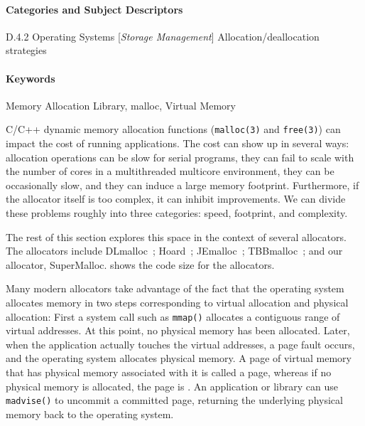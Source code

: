 \documentclass[natbib,sort&compress,10pt]{sigplanconf}
\newcommand{\code}[1]{\texttt{#1}}
\begin{document}
\paragraph{Categories and Subject Descriptors} D.4.2 Operating Systems [\textit{Storage Management}] Allocation/deallocation strategies

\paragraph{Keywords} Memory Allocation Library, malloc, Virtual Memory


C/C++ dynamic memory allocation functions (\code{malloc(3)} and
\code{free(3)}) can impact the cost of running applications.  The cost
can show up in several ways: allocation operations can be slow for
serial programs, they can fail to scale with the number of cores in a
multithreaded multicore environment, they can be occasionally slow,
and they can induce a large memory footprint.  Furthermore, if the
allocator itself is too complex, it can inhibit improvements.  We can
divide these problems roughly into three categories: speed, footprint,
and complexity. 

The rest of this section explores this space in the context of several
allocators.  The allocators include DLmalloc~\cite{Lea96};
Hoard~\cite{BergerMcBl00}; JEmalloc~\cite{Evans06};
TBBmalloc~\cite{KukanovVo07}; and our allocator, SuperMalloc.
 shows the code size for the allocators.

Many modern allocators take advantage of the fact that the operating
system allocates memory in two steps corresponding to virtual
allocation and physical allocation: First a system call such as
\code{mmap()} allocates a contiguous range of virtual addresses.  At
this point, no physical memory has been allocated.  Later, when the
application actually touches the virtual addresses, a page fault
occurs, and the operating system allocates physical memory.  A page of
virtual memory that has physical memory associated with it is called a
 page, whereas if no physical memory is allocated, the
page is .  An application or library can use
\code{madvise()} to uncommit a committed page, returning the
underlying physical memory back to the operating system.
\end{document}
